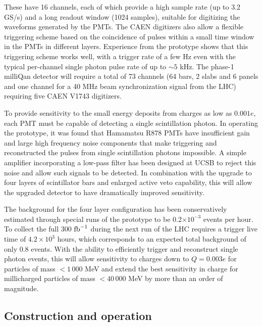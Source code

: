\documentclass[11pt]{article}
\theoremstyle{plain} \numberwithin{equation}{section}
\theoremstyle{definition}
\begin{document}
These have 16 channels, each of which provide a high sample rate (up to 3.2 GS/s) and a long readout window (1024 samples), 
suitable for digitizing the waveforms generated by the PMTs. The CAEN digitizers also allow a flexible triggering
scheme based on the coincidence of pulses within a small time window in the PMTs in different layers. 
Experience from the prototype shows that this triggering scheme works well, with a trigger rate of a few Hz even with the typical 
per-channel single photon pulse rate of up to $\sim 5$ kHz.
The phase-1 milliQan detector will require a total of 73 channels (64 bars, 2 slabs and 6 panels and one channel
for a 40 MHz beam synchronization signal from the LHC) requiring five CAEN V1743 digitizers. 

To provide sensitivity to the small energy deposits from charges as low as $0.001 e$,
each PMT must be capable of detecting a single scintillation photon.
In operating the prototype, it was found that Hamamatsu R878 PMTs have insufficient gain and large high frequency noise components
that make triggering and reconstructed the pulses from single scintillation photons impossible.
A simple amplifier incorporating a low-pass filter has been designed at UCSB to reject this noise and
allow such signals to be detected. In combination with the upgrade to four layers of scintillator bars
and enlarged active veto capability, this will allow the upgraded detector to have dramatically improved sensitivity.

The background for the four layer configuration has been conservatively estimated
through special runs of the prototype to be 0.2$\times10^{-3}$ events per hour. 
To collect the full 300 $\rm{fb}^{-1}$ during the next run of the LHC 
requires a trigger live time of $4.2\times 10^3$ hours, which corresponds 
to an expected total background of only 0.8 events. With the ability to efficiently trigger
and reconstruct single photon events, this will allow sensitivity to charges down to $Q=0.003 e$ for particles of
mass $< 1\,000$ MeV and extend the best sensitivity in charge for millicharged particles of mass $< 40\,000$ MeV
by more than an order of magnitude.

\subsection*{Construction and operation}
\end{document}
